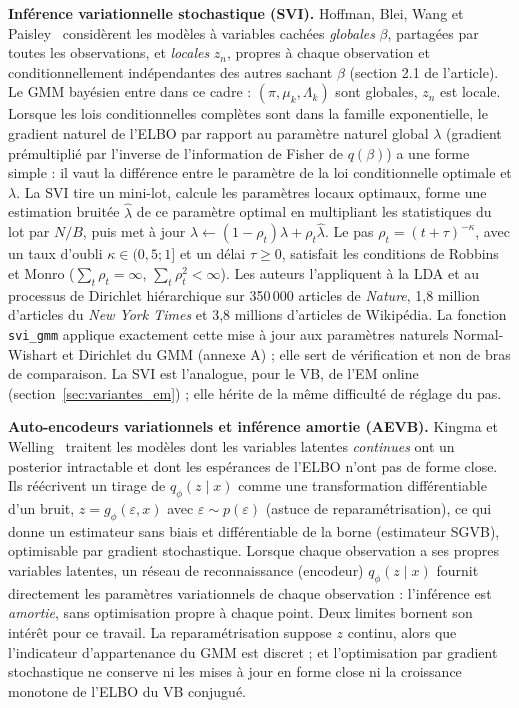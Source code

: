 \textbf{Inférence variationnelle stochastique (SVI). }Hoffman, Blei, Wang et Paisley~\cite{hoffman2013} considèrent les modèles à variables cachées \emph{globales} $\beta$, partagées par toutes les observations, et \emph{locales} $z_n$, propres à chaque observation et conditionnellement indépendantes des autres sachant $\beta$ (section 2.1 de l'article). Le GMM bayésien entre dans ce cadre : $(\pi, \mu_k, \Lambda_k)$ sont globales, $z_n$ est locale. Lorsque les lois conditionnelles complètes sont dans la famille exponentielle, le gradient naturel de l'ELBO par rapport au paramètre naturel global $\lambda$ (gradient prémultiplié par l'inverse de l'information de Fisher de $q(\beta)$) a une forme simple : il vaut la différence entre le paramètre de la loi conditionnelle optimale et $\lambda$. La SVI tire un mini-lot, calcule les paramètres locaux optimaux, forme une estimation bruitée $\hat\lambda$ de ce paramètre optimal en multipliant les statistiques du lot par $N/B$, puis met à jour $\lambda \leftarrow (1 - \rho_t)\lambda + \rho_t \hat\lambda$. Le pas $\rho_t = (t + \tau)^{-\kappa}$, avec un taux d'oubli $\kappa \in (0{,}5 ; 1]$ et un délai $\tau \geq 0$, satisfait les conditions de Robbins et Monro ($\sum_t \rho_t = \infty$, $\sum_t \rho_t^2 < \infty$). Les auteurs l'appliquent à la LDA et au processus de Dirichlet hiérarchique sur 350\,000 articles de \emph{Nature}, 1,8 million d'articles du \emph{New York Times} et 3,8 millions d'articles de Wikipédia. La fonction \texttt{svi\_gmm} applique exactement cette mise à jour aux paramètres naturels Normal-Wishart et Dirichlet du GMM (annexe A) ; elle sert de vérification et non de bras de comparaison. La SVI est l'analogue, pour le VB, de l'EM online (section~\ref{sec:variantes_em}) ; elle hérite de la même difficulté de réglage du pas.

\textbf{Auto-encodeurs variationnels et inférence amortie (AEVB). }Kingma et Welling~\cite{kingma2014} traitent les modèles dont les variables latentes \emph{continues} ont un posterior intractable et dont les espérances de l'ELBO n'ont pas de forme close. Ils réécrivent un tirage de $q_\phi(z \mid x)$ comme une transformation différentiable d'un bruit, $z = g_\phi(\varepsilon, x)$ avec $\varepsilon \sim p(\varepsilon)$ (astuce de reparamétrisation), ce qui donne un estimateur sans biais et différentiable de la borne (estimateur SGVB), optimisable par gradient stochastique. Lorsque chaque observation a ses propres variables latentes, un réseau de reconnaissance (encodeur) $q_\phi(z \mid x)$ fournit directement les paramètres variationnels de chaque observation : l'inférence est \emph{amortie}, sans optimisation propre à chaque point. Deux limites bornent son intérêt pour ce travail. La reparamétrisation suppose $z$ continu, alors que l'indicateur d'appartenance du GMM est discret ; et l'optimisation par gradient stochastique ne conserve ni les mises à jour en forme close ni la croissance monotone de l'ELBO du VB conjugué.

